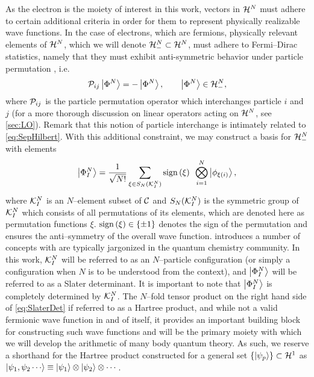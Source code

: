 As the electron is the moiety of interest in this work, vectors in $\mathcal{H}^N$ must adhere to certain additional 
criteria in order for them to represent physically realizable wave functions. In the case of electrons, which are 
fermions, physically relevant elements of $\mathcal{H}^N$, which we will denote $\mathcal{H}^N_- \subset \mathcal{H}^N$, must 
adhere to Fermi--Dirac statistics, namely that they must exhibit anti-symmetric behavior under particle permutation
\cite{Walecka12_book,Schuck04_book}, i.e.
\begin{equation}
  \label{eq:FermiDirac}
  \mathcal{P}_{ij} \left\vert \Phi^N \right\rangle = -\left\vert \Phi^N \right\rangle, \qquad \left\vert \Phi^N \right\rangle \in \mathcal{H}^N_-,
\end{equation} 
where $\mathcal{P}_{ij}$ is the particle permutation operator which interchanges particle $i$ and $j$ 
(for a more thorough discussion on linear operators acting on $\mathcal{H}^N$, see \cref{sec:LO}). Remark
that this notion of particle interchange is intimately related to \cref{eq:SepHilbert}. With this additional
constraint, we may construct a basis for $\mathcal{H}^N_-$ with elements
\begin{equation}
  \label{eq:SlaterDet}
  \left\vert \Phi^N_I \right\rangle = \frac{1}{\sqrt{N!}} \sum_{\xi \in S_N(\mathcal{K}^N_I)} \mathrm{sign}\left( \xi \right) \text{ } \bigotimes_{i = 1 }^N \left\vert \phi_{\xi(i)} \right\rangle,
\end{equation}
where $\mathcal{K}_I^N$ is an $N$--element subset of $\mathcal{C}$ and $S_N(\mathcal{K}_I^N)$ is the symmetric group
of $\mathcal{K}_I^N$ which consists of all permutations of its elements, which are denoted here as permutation
functions $\xi$. $\mathrm{sign}\left( \xi \right) \in \{ \pm 1 \}$ denotes the sign of the permutation and ensures the anti--symmetry of
the overall wave function.  introduces a number of concepts with are typically jargonized 
in the quantum chemistry community. In this work, $\mathcal{K}_I^N$ will be referred to as an $N$--particle
configuration (or simply a configuration when $N$ is to be understood from the context), and $\left\vert \Phi^N_I \right\rangle$
will be referred to as a Slater determinant. It is important to note that $\left\vert \Phi^N_I \right\rangle$ is completely 
determined by $\mathcal{K}_I^N$. The $N$--fold tensor product on the right hand side of \cref{eq:SlaterDet}
if referred to as a Hartree product, and while not a valid fermionic wave function in and of itself,
it provides an important building block for constructing such wave functions and will be the primary
moiety with which we will develop the arithmetic of many body quantum theory. As such, we reserve a shorthand
for the Hartree product constructed for a general set $\left \lbrace \left\vert \psi_p \right\rangle \right\rbrace\subset\mathcal{H}^1$ as
$ \ket{\psi_1,\psi_2\cdots} \equiv \ket{\psi_1} \otimes \ket{\psi_2} \otimes \cdots$.

